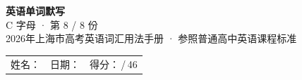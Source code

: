 \documentclass[10pt,a4paper]{article}
\begin{document}
\pagestyle{plain}

\begin{center}
{\LARGE\bfseries 英语单词默写}\\[0.22em]
{\large C 字母 · 第 8 / 8 份}\\[0.18em]
{\small 2026年上海市高考英语词汇用法手册 · 参照普通高中英语课程标准}
\end{center}

\vspace{0.25em}
\noindent\begin{tabular}{@{}p{}@{}p{}@{}p{}@{}}
姓名：\underline{\hspace{2.0cm}} & 日期：\underline{\hspace{2.0cm}} & 得分：\underline{\hspace{1.3cm}}\,/\,46 \\
\end{tabular}

\vspace{0.3em}

\vspace{0.08em}
\end{document}
